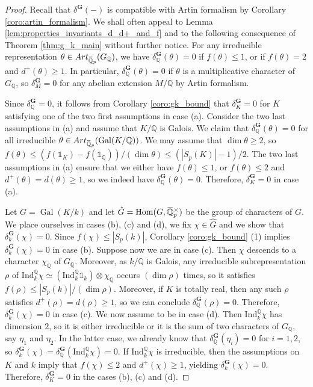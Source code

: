 \documentclass[12pt]{amsart}
\newcommand{\Q}{\mathbb{Q}}
\newcommand\bQ{\mathbb{Q}}
\newcommand{\ob}[1]{\mkern 1.5mu\overline{\mkern-1.5mu#1\mkern-1.5mu}\mkern 1.5mu}
\newcommand{\Ind}{\mathrm{Ind}}
\newcommand{\Art}{\textrm{Art}}
\DeclareMathOperator{\Gal}{Gal}
\DeclareMathOperator{\Hom}{Hom}
\theoremstyle{defstyle}
\theoremstyle{thmstyle}
\begin{document}
	\begin{proof}
		Recall that $\delta^\textbf{G}(-)$ is compatible with Artin formalism by Corollary \ref{coro:artin_formalism}. We shall often appeal to Lemma \ref{lem:properties_invariants_d_d+_and_f} and to the following consequence of Theorem \ref{thm:g_k_main} without further notice. For any irreducible representation $\theta \in \Art_{\ob{\bQ}_p}(G_\Q)$, we have $\delta_\Q^\textbf{G}(\theta)=0$ if $f(\theta)\leq 1$, or if $f(\theta)=2$ and $d^+(\theta)\geq 1$. In particular, $\delta_\Q^\textbf{G}(\theta)=0$ if $\theta$ is a multiplicative character of $G_\Q$, so $\delta_M^\textbf{G}=0$ for any abelian extension $M/\Q$ by Artin formalism. 
		
		Since $\delta_\Q^\textbf{G}=0$, it follows from Corollary \ref{coro:gk_bound} that $\delta_K^\textbf{G}=0$ for $K$ satisfying one of the two first assumptions in case (a). Consider the two last assumptions in (a) and assume that $K/\Q$ is Galois. We claim that $\delta_\Q^\textbf{G}(\theta)=0$ for all irreducible $\theta\in \Art_{\ob{\bQ}_p}(\Gal(K/\Q))$. We may assume that $\dim \theta\geq 2$, so $f(\theta)\leq (f(\mathds{1}_K)-f(\mathds{1}_\Q))/(\dim \theta)\leq (|S_p(K)|-1)/2$. The two last assumptions in (a) ensure that we either have $f(\theta)\leq 1$, or $f(\theta)\leq 2$ and $d^+(\theta)=d(\theta)\geq 1$, so we indeed have $\delta_\Q^\textbf{G}(\theta)=0$. Therefore, $\delta_K^\textbf{G}=0$ in case (a).
		
		Let $G=\Gal(K/k)$ and let $\hat{G}=\Hom(G,\ob{\Q}_p^\times)$ be the group of characters of $G$. We place ourselves in cases (b), (c) and (d), we fix ${\chi \in \hat{G}}$ and we show that $\delta_k^\textbf{G}(\chi)=0$. Since $f(\chi)\leq |S_p(k)|$, Corollary \ref{coro:gk_bound} (1) implies $\delta_k^\textbf{G}(\chi)=0$ in case (b). 
		Suppose now we are in case (c). Then $\chi$ descends to a character $\chi_\Q$ of $G_\Q$. Moreover, as $k/\Q$ is Galois, any irreducible subrepresentation $\rho$ of $\Ind_k^\Q \chi\simeq (\Ind_k^\Q \mathds{1}_k)\otimes\chi_\Q$ occurs $(\dim \rho)$ times, so it satisfies $f(\rho)\leq |S_p(k)|/(\dim \rho)$. Moreover, if $K$ is totally real, then any such $\rho$ satisfies $d^+(\rho)=d(\rho)\geq 1$, so we can conclude $\delta_\Q^\textbf{G}(\rho)=0$. Therefore, $\delta_k^\textbf{G}(\chi)=0$ in case (c).
		We now assume to be in case (d). Then $\Ind_k^\bQ \chi$ has dimension $2$, so it is either irreducible or it is the sum of two characters of $G_\Q$, say $\eta_1$ and $\eta_2$. In the latter case, we already know that $\delta_\bQ^\textbf{G}(\eta_i)=0$ for $i=1,2$, so $\delta_k^\textbf{G}(\chi)=\delta_\bQ^\textbf{G}(\Ind_k^\bQ \chi)=0$. If $\Ind_k^{\Q}\chi$ is irreducible, then the assumptions on $K$ and $k$ imply that $f(\chi)\leq2 $ and $d^+(\chi)\geq 1$, yielding $\delta_k^\textbf{G}(\chi)=0$. Therefore, $\delta_K^\textbf{G}=0$ in the cases (b), (c) and (d). 
		

\end{proof}
\end{document}
